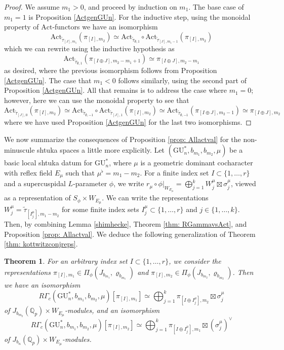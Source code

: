 \documentclass[reqno,11pt]{amsart}
\newtheorem{theorem}{Theorem}[section]
\theoremstyle{remark}
\newcommand{\GU}{\mathrm{GU}}
\newcommand{\Act}{\mathrm{Act}}
\newcommand{\ttau}{\tilde{\tau}}
\begin{document}
\begin{proof}
We assume $m_{1} > 0$, and proceed by induction on $m_{1}$. The base case of $m_{1} = 1$ is Proposition \ref{ActgenGUn}.  For the inductive step, using the monoidal property of $\Act$-functors we have an isomorphism  
\[ \Act_{\ttau_{[J],m_1}}(\pi_{[I],m_2}) \simeq \Act_{\ttau_{\emptyset,1}} \circ \Act_{\ttau_{[J],m_1 - 1}}(\pi_{[I],m_{2}}) \]
which we can rewrite using the inductive hypothesis as 
\[ \Act_{\ttau_{\emptyset,1}}(\pi_{[I \oplus J],m_{2} - m_{1} + 1}) \simeq \pi_{[I \oplus J],m_{2} - m_{1}} \]
as desired, where the previous isomorphism follows from Proposition \ref{ActgenGUn}. The case that $m_{1} < 0$ follows similarly, using the second part of Proposition \ref{ActgenGUn}. All that remains is to address the case where $m_{1} = 0$; however, here we can use the monoidal property to see that 
\[ \Act_{\ttau_{[J],0}}(\pi_{[I],m_2}) \simeq  \Act_{\ttau_{\emptyset,-1}} \circ \Act_{\ttau_{[J],1}}(\pi_{[I],m_2}) \simeq \Act_{\ttau_{\emptyset,-1}}(\pi_{[I \oplus J],m_{2} - 1}) \simeq \pi_{[I \oplus J],m_{2}} \]
where we have used Proposition \ref{ActgenGUn} for the last two isomorphisms. 
\end{proof}
We now summarize the consequences of Proposition \ref{prop: Allactval} for the non-minuscule shtuka spaces a little more explicitly. Let $(\GU^*_{n},b_{m_1},b_{m_2},\mu)$ be a basic local shtuka datum for $\GU^*_{n}$, where $\mu$ is a geometric dominant cocharacter with reflex field $E_{\mu}$ such that $\mu^{\flat} = m_1 - m_2$. For a finite index set $I \subset \{1,\ldots,r\}$ and a supercuspidal $L$-parameter $\phi$, we write $r_{\mu} \circ \phi|_{W_{E_{\mu}}} = \bigoplus_{j = 1}^{k} W^{\mu}_{j} \boxtimes \sigma_{j}^{\mu}$, viewed as a representation of $S_{\phi} \times W_{E_{\mu}}$. We can write the representations $W_{j}^{\mu} = \ttau_{[I^{\mu}_{j}],m_1 - m_2}$ for some finite index sets $I^{\mu}_{j} \subset \{1,\ldots,r\}$ and $j \in \{1,\ldots,k\}$. Then, by combining Lemma \ref{shimhecke}, Theorem \ref{thm: RGammavsAct}, and Proposition \ref{prop: Allactval}. We deduce the following generalization of Theorem \ref{thm: kottwitzconjreps}.
\begin{theorem}{\label{nonmindescr}}
For an arbitrary index set $I \subset \{1,\ldots,r\}$, we consider the representations $\pi_{[I],m_1} \in \Pi_{\phi}(J_{b_{m_1}}, \varrho_{b_{m_1}})$ and $\pi_{[I],m_2} \in \Pi_{\phi}(J_{b_{m_2}}, \varrho_{b_{m_2}})$. Then we have an isomorphism
\[ R\Gamma_{c}(\GU^*_n,b_{m_1},b_{m_2},\mu)[\pi_{[I],m_1}] \simeq  \bigoplus_{j = 1}^{k}  \pi_{[I \oplus I^{\mu}_{j}],m_2} \boxtimes {\sigma_{j}^{\mu}}  \]
of $J_{b_{m_2}}(\mathbb{Q}_{p}) \times W_{E_{\mu}}$-modules, and an isomorphism 
\[ R\Gamma_{c}(\GU^*_n,b_{m_1},b_{m_2},\mu)[\pi_{[I],m_2}] \simeq  \bigoplus_{j = 1}^{k}  \pi_{[I \oplus I^{\mu}_{j}], m_1} \boxtimes (\sigma_{j}^{\mu})^{\vee} \]
of $J_{b_{n}}(\mathbb{Q}_{p}) \times W_{E_{\mu}}$-modules. 
\end{theorem}
\end{document}
